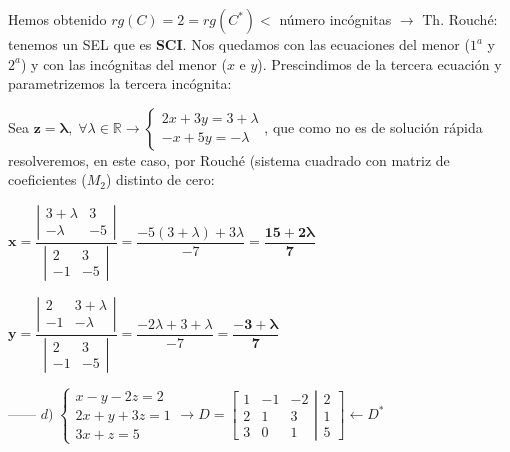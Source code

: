 \begin{proofw}
Hemos obtenido $rg(C)=2=rg(C^*)<$ número incógnitas $\to$ Th. Rouché: tenemos un SEL que es \textbf{SCI}. Nos quedamos con las ecuaciones del menor ($1^a$ y $2^a$) y con las incógnitas del menor ($x$ e $y$). Prescindimos de la tercera ecuación y parametrizemos la tercera incógnita:

Sea $\boldsymbol{ z=\lambda}, \; \forall \lambda \in \mathbb R \to \begin{cases}
 2x+3y=3+\lambda \\-x+5y=-\lambda	
 \end{cases}$, que como no es de solución rápida resolveremos, en este caso, por Rouché (sistema cuadrado con matriz de coeficientes ($M_2$) distinto de cero:
 
 $\displaystyle \boldsymbol{x}= \dfrac 
 {\left| \begin{matrix}3+\lambda&3\\-\lambda&-5 \end{matrix} \right|}
 {\left| \begin{matrix} 2&3\\-1&-5 \end{matrix} \right|}
 = \dfrac {-5(3+\lambda)+3\lambda}{-7}= \boldsymbol{ \dfrac {15+2\lambda}{7}}$
 

 $\displaystyle \boldsymbol{y}= \dfrac 
 {\left| \begin{matrix} 2&3+\lambda\\-1&-\lambda \end{matrix} \right|}
 {\left| \begin{matrix} 2&3\\-1&-5 \end{matrix} \right|}
 = \dfrac {-2\lambda+3+\lambda}{-7}= \boldsymbol{ \dfrac {-3+\lambda}{7}}$





------ $d)\; \begin{cases}   x-y-2z=2\\2x+y+3z=1\\3x+z=5\end{cases} \to D=\left[ \begin{matrix}  1&-1&-2\\2&1&3\\3&0&1 
\end{matrix} \right| \left. \begin{matrix} 
 2\\1\\5	
 \end{matrix} \right] \leftarrow D^*$


\end{proofw}
